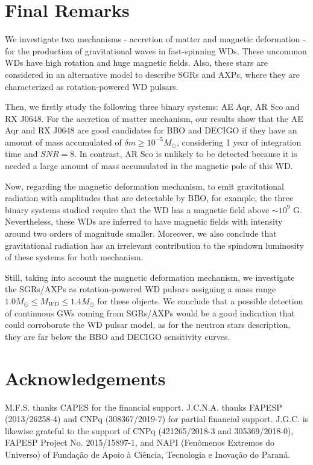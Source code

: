 \documentclass{ws-procs961x669}            %
\begin{document}
\section{Final Remarks}
\label{aba:sec4}

We investigate two mechanisms - accretion of matter and magnetic deformation - for the production of gravitational waves in fast-spinning WDs. These uncommon WDs have high rotation and huge magnetic fields. Also, these stars are considered in an alternative model to describe SGRs and AXPs, where they are characterized as rotation-powered WD pulsars.

Then, we firstly study the following three binary systems: AE Aqr, AR Sco and RX J0648. For the accretion of matter mechanism, our results show that the AE Aqr and RX J0648 are good candidates for BBO and DECIGO if they have an amount of mass accumulated of $\delta m \geq 10^{-5}M_{\odot}$, considering 1 year of integration time and $SNR = 8$. In contrast, AR Sco is unlikely to be detected because it is needed a large amount of mass accumulated in the magnetic pole of this WD. 

Now, regarding the magnetic deformation mechanism, to emit gravitational radiation with amplitudes that are detectable by BBO, for example, the three binary systems studied require that the WD has a magnetic field above $\sim 10^{9}$ G. Nevertheless, these WDs are inferred to have magnetic fields with intensity around two orders of magnitude smaller. Moreover, we also conclude that gravitational radiation has an irrelevant contribution to the spindown luminosity of these systems for both mechanism.

Still, taking into account the magnetic deformation mechanism, we investigate the SGRs/AXPs as rotation-powered WD pulsars assigning a mass range $1.0 M_{\odot} \leq   M_{WD} \leq  1.4 M_{\odot}$ for these objects. We conclude that a possible detection of continuous GWs coming from SGRs/AXPs would be a good indication that could corroborate the WD pulsar model, as for the neutron stars description, they are far below the BBO and DECIGO sensitivity curves.




\section*{Acknowledgements}
M.F.S. thanks CAPES for the financial support. J.C.N.A. thanks FAPESP (2013/26258-4) and CNPq (308367/2019-7) for partial financial support. J.G.C. is likewise grateful to the support of  CNPq (421265/2018-3 and 305369/2018-0), FAPESP Project No. 2015/15897-1, and NAPI (Fenômenos Extremos do Universo) of Fundação de Apoio à Ciência, Tecnologia e Inovação do Paraná. 





\end{document}
